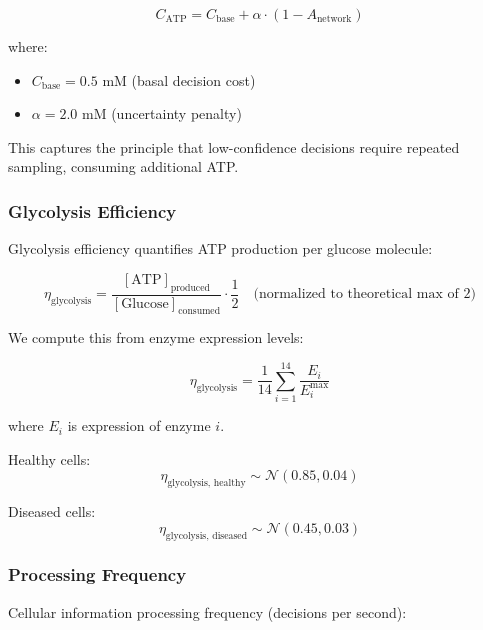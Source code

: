 \documentclass{article}
\begin{document}
\begin{equation}
C_{\text{ATP}} = C_{\text{base}} + \alpha \cdot (1 - A_{\text{network}})
\end{equation}

where:
\begin{itemize}
    \item $C_{\text{base}} = 0.5$ mM (basal decision cost)
    \item $\alpha = 2.0$ mM (uncertainty penalty)
\end{itemize}

This captures the principle that low-confidence decisions require repeated sampling, consuming additional ATP.

\subsubsection{Glycolysis Efficiency}

Glycolysis efficiency quantifies ATP production per glucose molecule:

\begin{equation}
\eta_{\text{glycolysis}} = \frac{[\text{ATP}]_{\text{produced}}}{[\text{Glucose}]_{\text{consumed}}} \cdot \frac{1}{2} \quad \text{(normalized to theoretical max of 2)}
\end{equation}

We compute this from enzyme expression levels:

\begin{equation}
\eta_{\text{glycolysis}} = \frac{1}{14} \sum_{i=1}^{14} \frac{E_i}{E_i^{\text{max}}}
\end{equation}

where $E_i$ is expression of enzyme $i$.

Healthy cells:
\begin{equation}
\eta_{\text{glycolysis, healthy}} \sim \mathcal{N}(0.85, 0.04)
\end{equation}

Diseased cells:
\begin{equation}
\eta_{\text{glycolysis, diseased}} \sim \mathcal{N}(0.45, 0.03)
\end{equation}

\subsubsection{Processing Frequency}

Cellular information processing frequency (decisions per second):
\end{document}
